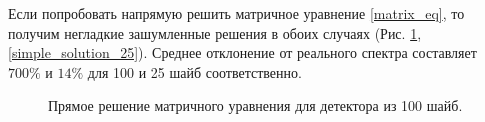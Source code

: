 \documentclass{config}
\begin{document}
Если попробовать напрямую решить матричное уравнение \ref{matrix_eq}, то получим негладкие зашумленные решения в обоих случаях (Рис. \ref{simple_solution}, \ref{simple_solution_25}). Среднее отклонение от реального спектра составляет $700\%$ и $14\%$ для 100 и 25 шайб соответственно.

\begin{figure}[h]
\begin{minipage}[h]{0.5\linewidth}
    \caption{Прямое решение матричного уравнения для детектора из 100 шайб.}
    \label{simple_solution}
\end{minipage}
\hfill
\begin{minipage}[h]{0.5\linewidth}

\end{minipage}
\end{figure}
\end{document}
